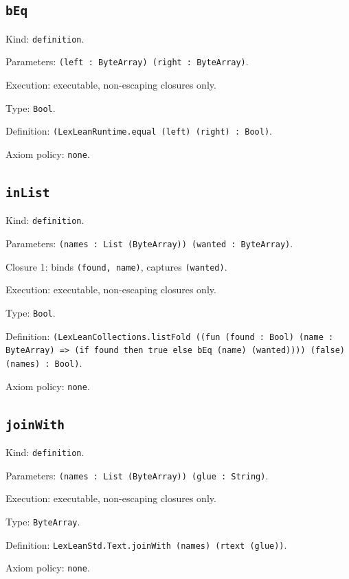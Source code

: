 \documentclass[11pt]{article}
\begin{document}
\subsection*{\texttt{bEq}}
\noindent Kind: \texttt{definition}.\par
\noindent Parameters: \texttt{(left : ByteArray) (right : ByteArray)}.\par
\noindent Execution: executable, non-escaping closures only.\par
\noindent Type: \texttt{Bool}.\par
\noindent Definition: \texttt{(LexLeanRuntime.equal (left) (right) : Bool)}.\par
\noindent Axiom policy: \texttt{none}.\par
\subsection*{\texttt{inList}}
\noindent Kind: \texttt{definition}.\par
\noindent Parameters: \texttt{(names : List (ByteArray)) (wanted : ByteArray)}.\par
\noindent Closure 1: binds \texttt{(found, name)}, captures \texttt{(wanted)}.\par
\noindent Execution: executable, non-escaping closures only.\par
\noindent Type: \texttt{Bool}.\par
\noindent Definition: \texttt{(LexLeanCollections.listFold ((fun (found : Bool) (name : ByteArray) => (if found then true else bEq (name) (wanted)))) (false) (names) : Bool)}.\par
\noindent Axiom policy: \texttt{none}.\par
\subsection*{\texttt{joinWith}}
\noindent Kind: \texttt{definition}.\par
\noindent Parameters: \texttt{(names : List (ByteArray)) (glue : String)}.\par
\noindent Execution: executable, non-escaping closures only.\par
\noindent Type: \texttt{ByteArray}.\par
\noindent Definition: \texttt{LexLeanStd.Text.joinWith (names) (rtext (glue))}.\par
\noindent Axiom policy: \texttt{none}.\par
\end{document}
